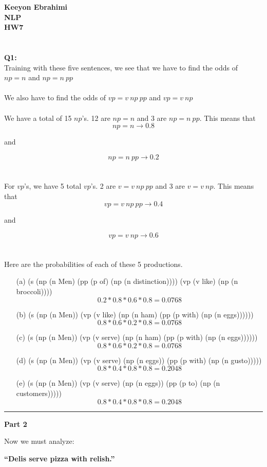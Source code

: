 \documentclass[ruled]{article}
\begin{document}
\textbf{Keeyon Ebrahimi}\\
\textbf{NLP}\\
\textbf{HW7}\\ \\ \\

\textbf{Q1:} \\
Training with these five sentences, we see that we have to find the odds of \\
$np = n$ and $np = n\ pp$\\
\\
We also have to find the odds of $vp = v\ np\ pp$ and $vp = v\ np$\\ \\

We have a total of 15 $np$'s.  12 are $np = n$ and 3 are $np = n\ pp$.  This means that 
$$np = n \rightarrow 0.8$$  
\begin{center}
and 
\end{center} 
 $$np = n\ pp \rightarrow 0.2$$ 
\\ \\
For $vp$'s, we have 5 total $vp$'s.  2 are $v = v\ np\ pp$ and 3 are $v = v\ np$.  This means that
$$vp = v\ np\ pp \rightarrow 0.4$$
\begin{center}
and
\end{center}
$$vp = v\ np \rightarrow 0.6$$
\\ \\

Here are the probabilities of each of these 5 productions.

\begin{itemize}
\item[(a)]  (s (np (n Men) (pp (p of) (np (n distinction)))) (vp (v like) (np (n broccoli)))) 
\\
$$0.2 * 0.8 * 0.6 * 0.8 = 0.0768$$
\item[(b)]  (s (np (n Men)) (vp (v like)  (np (n ham)   (pp (p with) (np (n eggs))))))  
\\
$$0.8 * 0.6 * 0.2 * 0.8 = 0.0768$$
\item[(c)]  (s (np (n Men)) (vp (v serve) (np (n ham)   (pp (p with) (np (n eggs))))))  
\\
$$0.8 * 0.6 * 0.2 * 0.8 = 0.0768$$
\item[(d)]  (s (np (n Men)) (vp (v serve) (np (n eggs)) (pp (p with) (np (n gusto)))))  
\\
$$0.8 * 0.4 * 0.8 * 0.8 = 0.2048$$
\item[(e)]  (s (np (n Men)) (vp (v serve) (np (n eggs)) (pp (p to)   (np (n customers)))))  
\\
$$0.8 * 0.4 * 0.8 * 0.8 = 0.2048$$
\end{itemize}
\noindent\rule{15cm}{0.8pt}
\begin{center}
{\Large \textbf{Part 2}}
\end{center}
Now we must analyze: 
\\
\begin{center}
\textbf{“Delis serve pizza with relish.”}
\end{center}
\end{document}

